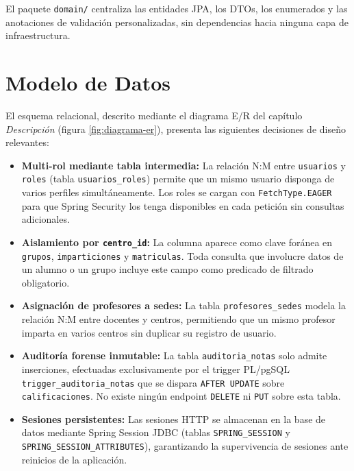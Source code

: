 \documentclass[12pt, a4paper]{report}
\begin{document}
El paquete \texttt{domain/} centraliza las entidades JPA, los DTOs, los
enumerados y las anotaciones de validación personalizadas, sin dependencias
hacia ninguna capa de infraestructura.

\section{Modelo de Datos}

El esquema relacional, descrito mediante el diagrama E/R del capítulo
\textit{Descripción} (figura \ref{fig:diagrama-er}), presenta las siguientes
decisiones de diseño relevantes:

\begin{itemize}
  \item \textbf{Multi-rol mediante tabla intermedia:} La relación N:M entre
        \texttt{usuarios} y \texttt{roles} (tabla \texttt{usuarios\_roles}) permite
        que un mismo usuario disponga de varios perfiles simultáneamente. Los roles
        se cargan con \texttt{FetchType.EAGER} para que Spring Security los tenga
        disponibles en cada petición sin consultas adicionales.
  \item \textbf{Aislamiento por \texttt{centro\_id}:} La columna aparece como
        clave foránea en \texttt{grupos}, \texttt{imparticiones} y
        \texttt{matriculas}. Toda consulta que involucre datos de un alumno o un
        grupo incluye este campo como predicado de filtrado obligatorio.
  \item \textbf{Asignación de profesores a sedes:} La tabla
        \texttt{profesores\_sedes} modela la relación N:M entre docentes y centros,
        permitiendo que un mismo profesor imparta en varios centros sin duplicar su
        registro de usuario.
  \item \textbf{Auditoría forense inmutable:} La tabla \texttt{auditoria\_notas}
        solo admite inserciones, efectuadas exclusivamente por el trigger PL/pgSQL
        \texttt{trigger\_auditoria\_notas} que se dispara \texttt{AFTER UPDATE}
        sobre \texttt{calificaciones}. No existe ningún endpoint \texttt{DELETE}
        ni \texttt{PUT} sobre esta tabla.
  \item \textbf{Sesiones persistentes:} Las sesiones HTTP se almacenan en la
        base de datos mediante Spring Session JDBC (tablas
        \texttt{SPRING\_SESSION} y \texttt{SPRING\_SESSION\_ATTRIBUTES}),
        garantizando la supervivencia de sesiones ante reinicios de la aplicación.
\end{itemize}
\end{document}

